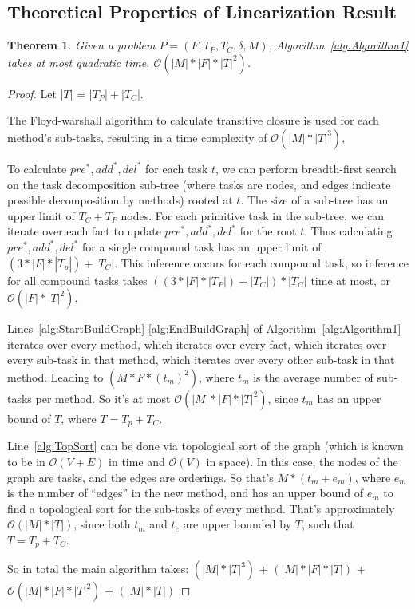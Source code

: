 \documentclass[letterpaper]{article}
\newtheorem{theorem}{Theorem}
\newtheorem{proof}{Proof}
\newcommand{\PreS} {\ensuremath{\mathit{pre^{*}}}}
\newcommand{\AddS} {\ensuremath{\mathit{add^{*}}}}
\newcommand{\DelS} {\ensuremath{\mathit{del^{*}}}}
\begin{document}
\subsection{Theoretical Properties of Linearization Result}
\begin{theorem}\label{thm:Runtime}
	Given a problem $P = (F, T_P, T_C, \delta, M)$, Algorithm~\ref{alg:Algorithm1} takes at most quadratic time, $\mathcal{O}( |M| * |F| * |T|^2)$. 
\end{theorem}
\begin{proof}  %
	Let $|T|$ = $|T_P| + |T_C|$.
	
	The Floyd-warshall algorithm to calculate transitive closure is used for each method's sub-tasks, resulting in a time complexity of $\mathcal{O}(|M| * |T|^3)$, 

		
	To calculate $\PreS, \AddS, \DelS$ for each task $t$, we can perform breadth-first search on the task decomposition sub-tree (where tasks are nodes, and edges indicate possible decomposition by methods) rooted at $t$. The size of a sub-tree has an upper limit of $T_C + T_P$ nodes. For each primitive task in the sub-tree, we can iterate over each fact to update $\PreS, \AddS, \DelS$ for the root $t$. Thus calculating  $\PreS, \AddS, \DelS$ for a single compound task has an upper limit of $(3 * |F| * |T_p|) + |T_C|$. This inference occurs for each compound task, so inference for all compound tasks takes $((3 * |F| * |T_P|) + |T_C|) * |T_C|$ time at most, or $\mathcal{O}(|F| * |T|^2)$.
	
	Lines~\ref{alg:StartBuildGraph}-\ref{alg:EndBuildGraph} of Algorithm~\ref{alg:Algorithm1} iterates over every method, which iterates over every fact, which iterates over every sub-task in that method, which iterates over every other sub-task in that method. Leading to $(M * F * (t_m)^2)$, where $t_m$ is the average number of sub-tasks per method. So it's at most $\mathcal{O}(|M| * |F| * |T|^2)$, since $t_m$ has an upper bound of $T$, where $T=T_p + T_C$.		

	Line~\ref{alg:TopSort} can be done via topological sort of the graph (which is known to be in $\mathcal{O}(V+E)$ in time and $\mathcal{O}(V)$ in space). In this case, the nodes of the graph are tasks, and the edges are orderings. So that's $M * (t_m+e_m)$, where $e_m$ is the number of \enquote{edges} in the new method, and has an upper bound of $e_m$ to find a topological sort for the sub-tasks of every method. That's approximately $\mathcal{O}(|M| * |T|)$, since both $t_m$ and $t_e$ are upper bounded by $T$, such that $T=T_p + T_C$.
	
	So in total the main algorithm takes: \newline
	$(|M| * |T|^3)$ +          %
	$(|M| * |F| * |T|)$  +    %
	$\mathcal{O}(|M| * |F| * |T|^2)$ +  %
	$(|M| * |T|)$        %
\end{proof}
\end{document}
